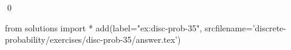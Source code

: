 
\begin{ex} 
  \label{ex:disc-prob-35}
  
  \qed
\end{ex} 
\begin{python0}
from solutions import *
add(label="ex:disc-prob-35",
    srcfilename='discrete-probability/exercises/disc-prob-35/answer.tex') 
\end{python0}
